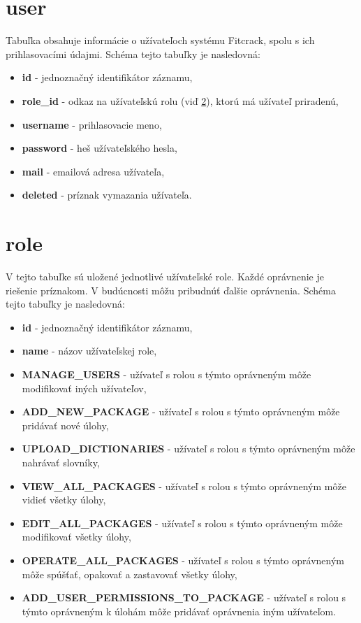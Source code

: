 \documentclass[zadani,slovak]{fitthesis}
\begin{document}
\section{user}
Tabuľka obsahuje informácie o užívateľoch systému Fitcrack, spolu s ich prihlasovacími údajmi. Schéma tejto tabuľky je nasledovná:
\begin{itemize}
    \item \textbf {id} - jednoznačný identifikátor záznamu,
    \item \textbf {role\_id} - odkaz na užívateľskú rolu (viď \ref{fcRole}), ktorú má užívateľ priradenú,
    \item \textbf {username} - prihlasovacie meno,
    \item \textbf {password} - heš užívateľského hesla,
    \item \textbf {mail} - emailová adresa užívateľa,
    \item \textbf {deleted} - príznak vymazania užívateľa.
\end{itemize}




\section{role} \label{fcRole}
V tejto tabuľke sú uložené jednotlivé užívateľské role. Každé oprávnenie je riešenie príznakom. V budúcnosti môžu pribudnúť ďalšie oprávnenia. Schéma tejto tabuľky je nasledovná:



\begin{itemize}
\item \textbf{id} - jednoznačný identifikátor záznamu,
\item \textbf{name} - názov užívateľskej role,
\item \textbf{MANAGE\_USERS} - užívateľ s rolou s týmto oprávneným môže modifikovať iných užívateľov,
\item \textbf{ADD\_NEW\_PACKAGE} -  užívateľ s rolou s týmto oprávneným môže pridávať nové úlohy,
\item \textbf{UPLOAD\_DICTIONARIES} -  užívateľ s rolou s týmto oprávneným môže nahrávať slovníky,
\item \textbf{VIEW\_ALL\_PACKAGES} -  užívateľ s rolou s týmto oprávneným môže vidieť všetky úlohy,
\item \textbf{EDIT\_ALL\_PACKAGES} -  užívateľ s rolou s týmto oprávneným môže modifikovať všetky úlohy,
\item \textbf{OPERATE\_ALL\_PACKAGES} -  užívateľ s rolou s týmto oprávneným môže spúšťať, opakovať a zastavovať všetky úlohy,
\item \textbf{ADD\_USER\_PERMISSIONS\_TO\_PACKAGE} -  užívateľ s rolou s týmto oprávneným k úlohám môže pridávať oprávnenia iným užívateľom.
\end{itemize}

  
  
\end{document}
